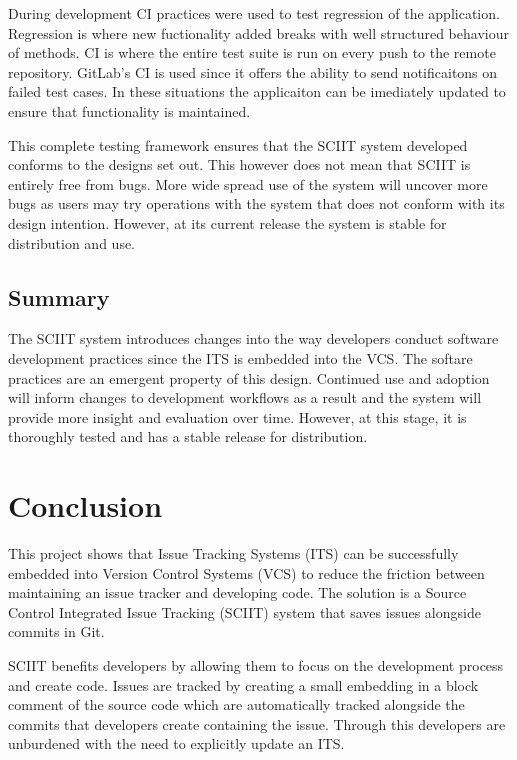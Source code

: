 \documentclass{mproj}
\begin{document}
During development CI practices were used to test regression of the application. Regression is where new fuctionality added breaks with well structured behaviour of methods. CI is where the entire test suite is run on every push to the remote repository. GitLab's CI is used since it offers the ability to send notificaitons on failed test cases. In these situations the applicaiton can be imediately updated to ensure that functionality is maintained.

This complete testing framework ensures that the SCIIT system developed conforms to the designs set out. This however does not mean that SCIIT is entirely free from bugs. More wide spread use of the system will uncover more bugs as users may try operations with the system that does not conform with its design intention. However, at its current release the system is stable for distribution and use.


\section{Summary}

The SCIIT system introduces changes into the way developers conduct software development practices since the ITS is embedded into the VCS. The softare practices are an emergent property of this design. Continued use and adoption will inform changes to development workflows as a result and the system will provide more insight and evaluation over time. However, at this stage, it is thoroughly tested and has a stable release for distribution.




\chapter{Conclusion}\label{conclusion}

This project shows that Issue Tracking Systems (ITS) can be successfully embedded into Version Control Systems (VCS) to reduce the friction between maintaining an issue tracker and developing code. The solution is a Source Control Integrated Issue Tracking (SCIIT) system that saves issues alongside commits in Git.

SCIIT benefits developers by allowing them to focus on the development process and create code. Issues are tracked by creating a small embedding in a block comment of the source code which are automatically tracked alongside the commits that developers create containing the issue. Through this developers are unburdened with the need to explicitly update an ITS.
\end{document}
